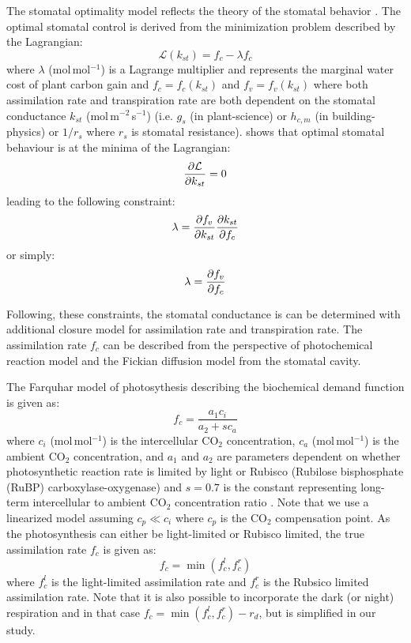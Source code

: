 The stomatal optimality model reflects the theory of the stomatal behavior \citep{Cowan1978}. The optimal stomatal control is derived from the minimization problem described by the Lagrangian:
\begin{equation} 
\mathcal{L}(k_{st}) = f_c - \lambda f_c
\end{equation}
where $\lambda$ (mol\,mol$^{-1}$) is a Lagrange multiplier and represents the marginal water cost of plant carbon gain \citep{Medlyn2011,Katul2010,Manoli2014} and $f_c = f_c(k_{st})$ and $f_v=f_v(k_{st})$ where both assimilation rate and transpiration rate are both dependent on the stomatal conductance $k_{\textit{st}}$ (mol\,m$^{-2}$\,s$^{-1}$) (i.e. $g_s$ (in plant-science) or $h_{c,m}$ (in building-physics) or $1/r_s$ where $r_s$ is stomatal resistance). \cite{Cowan1978} shows that optimal stomatal behaviour is at the minima of the Lagrangian:
\begin{equation}
\frac{\partial \mathcal{L}}{\partial k_{st}} = 0
\end{equation}
leading to the following constraint:
\begin{equation}
\lambda = \frac{\partial f_v}{\partial k_{st}}\frac{\partial k_{st}}{\partial f_c} 
\end{equation}
or simply:
\begin{equation}
\lambda = \frac{\partial f_v}{\partial f_c} 
\end{equation}

Following, these constraints, the stomatal conductance is can be determined with additional closure model for assimilation rate and transpiration rate. The assimilation rate $f_c$ can be described from the perspective of photochemical reaction model and the Fickian diffusion model from the stomatal cavity. 

The Farquhar model of photosythesis describing the biochemical demand function is given as:
\begin{equation}
f_c = \frac{a_1 c_i}{a_2 + sc_a}
\end{equation}
where $c_i$ (mol\,mol$^{-1}$)  is the intercellular CO$_2$ concentration, $c_a$ (mol\,mol$^{-1}$) is the ambient CO$_2$ concentration, and $a_1$ and $a_2$ are parameters dependent on whether photosynthetic reaction rate is limited by light or Rubisco (Rubilose bisphosphate (RuBP) carboxylase-oxygenase) \citep{Katul2010, Farquhar1980} and $s=0.7$ is the constant representing long-term intercellular to ambient CO$_2$ concentration ratio \citep{Volpe2013}. Note that we use a linearized model assuming $c_p \ll c_i$ where $c_p$ is the CO$_2$ compensation point. As the photosynthesis can either be light-limited or Rubisco limited, the true assimilation rate $f_c$ is given as:
\begin{equation}
f_c = \min \left(f_{c}^l, f_c^r\right) 
\end{equation}
where $f_c^l$ is the light-limited assimilation rate and $f_c^r$ is the Rubsico limited assimilation rate. Note that it is also possible to incorporate the dark (or night) respiration and in that case $f_c = \min \left(f_c^l, f_c^r\right) - r_d$, but is simplified in our study.

